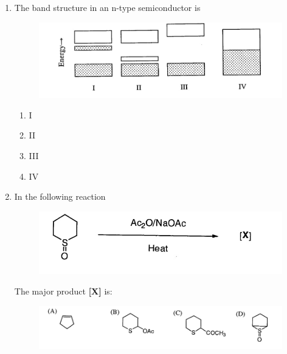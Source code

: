 \documentclass[journal,12pt,onecolumn]{IEEEtran}
\theoremstyle{remark}
\begin{document}
\begin{enumerate}
\item    The band structure in an n-type semiconductor is \hfill{}
 


\begin{figure}[H][H]
    \centering
   \includegraphics[width=0.6\columnwidth]{figs/image1.jpg}
      \caption{}
    \label{fig:figure1}
\end{figure}
   


\begin{multicols}{2}
\begin{enumerate}
\item I  
\item II  
\item III  
\item IV  
\end{enumerate}
\end{multicols}
 



\item    In the following reaction \hfill{}
 

\begin{figure}[H][H]
    \centering
    \includegraphics[width=0.5\columnwidth]{figs/image2.jpg}
    \caption{}
    \label{fig:figure2}
\end{figure}




\noindent The major product \textbf{[X]} is:
 
\begin{figure}[H][H]
    \centering
    \includegraphics[width=0.8\columnwidth]{figs/image3.jpg}
    \caption{}
    \label{fig:figure3}
\end{figure}



\end{enumerate}
\end{document}
